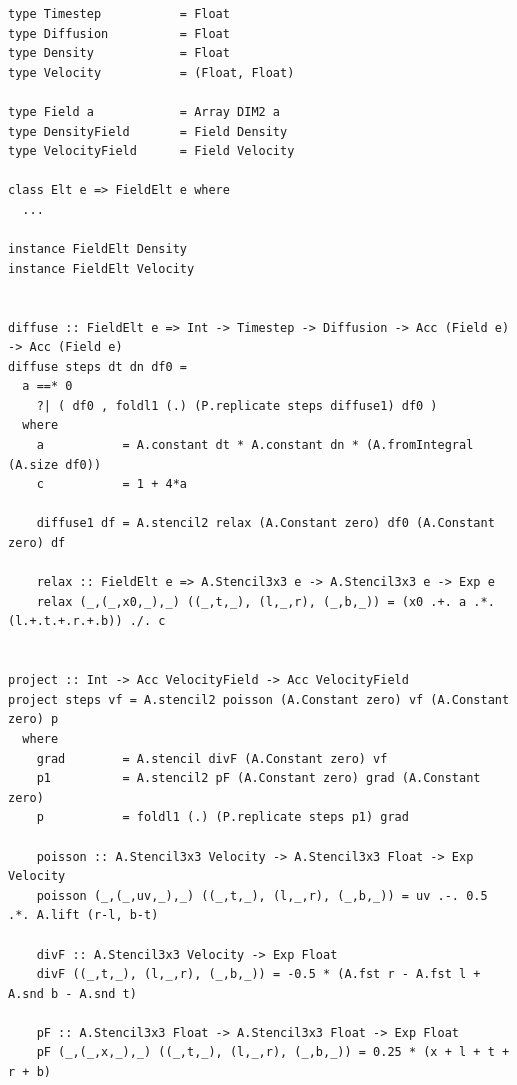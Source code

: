 \begin{lstlisting}[style=haskell_float
    ,label=lst:fluid
    ,caption={Fluid flow simulation}]
type Timestep           = Float
type Diffusion          = Float
type Density            = Float
type Velocity           = (Float, Float)

type Field a            = Array DIM2 a
type DensityField       = Field Density
type VelocityField      = Field Velocity

class Elt e => FieldElt e where
  ...

instance FieldElt Density
instance FieldElt Velocity


diffuse :: FieldElt e => Int -> Timestep -> Diffusion -> Acc (Field e) -> Acc (Field e)
diffuse steps dt dn df0 =
  a ==* 0
    ?| ( df0 , foldl1 (.) (P.replicate steps diffuse1) df0 )
  where
    a           = A.constant dt * A.constant dn * (A.fromIntegral (A.size df0))
    c           = 1 + 4*a

    diffuse1 df = A.stencil2 relax (A.Constant zero) df0 (A.Constant zero) df

    relax :: FieldElt e => A.Stencil3x3 e -> A.Stencil3x3 e -> Exp e
    relax (_,(_,x0,_),_) ((_,t,_), (l,_,r), (_,b,_)) = (x0 .+. a .*. (l.+.t.+.r.+.b)) ./. c


project :: Int -> Acc VelocityField -> Acc VelocityField
project steps vf = A.stencil2 poisson (A.Constant zero) vf (A.Constant zero) p
  where
    grad        = A.stencil divF (A.Constant zero) vf
    p1          = A.stencil2 pF (A.Constant zero) grad (A.Constant zero)
    p           = foldl1 (.) (P.replicate steps p1) grad

    poisson :: A.Stencil3x3 Velocity -> A.Stencil3x3 Float -> Exp Velocity
    poisson (_,(_,uv,_),_) ((_,t,_), (l,_,r), (_,b,_)) = uv .-. 0.5 .*. A.lift (r-l, b-t)

    divF :: A.Stencil3x3 Velocity -> Exp Float
    divF ((_,t,_), (l,_,r), (_,b,_)) = -0.5 * (A.fst r - A.fst l + A.snd b - A.snd t)

    pF :: A.Stencil3x3 Float -> A.Stencil3x3 Float -> Exp Float
    pF (_,(_,x,_),_) ((_,t,_), (l,_,r), (_,b,_)) = 0.25 * (x + l + t + r + b)
\end{lstlisting}


